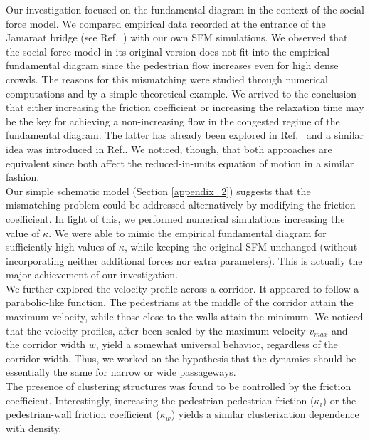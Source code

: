 \documentclass[preprint,12pt]{elsarticle}
\begin{document}
Our investigation focused on the fundamental diagram in the context of the 
social force model. We compared empirical data recorded at 
the entrance of the Jamaraat bridge (see Ref.~\cite{helbing3}) with our own SFM 
simulations. We observed  that the  social force model in its 
original version does not fit into the empirical fundamental 
diagram since the pedestrian flow increases even for high dense 
crowds. The reasons for this mismatching were studied through 
numerical computations and by a simple theoretical example. We arrived to the 
conclusion that either increasing the friction coefficient or increasing the 
relaxation time may be the key for achieving a non-increasing 
flow in the congested regime of the fundamental diagram. The 
latter has already been explored in Ref.~\cite{johansson} and a 
similar idea was introduced in Ref.\cite{parisi2}. We noticed, 
though, that both approaches are equivalent since both affect 
the reduced-in-units equation of motion in a similar fashion.\\

Our simple schematic model (Section \ref{appendix_2}) suggests 
that the mismatching problem could be addressed 
alternatively by  modifying the friction coefficient. In light 
of this, we performed numerical simulations increasing the 
value of $\kappa$. We were able to mimic the empirical 
fundamental diagram for sufficiently high values of $\kappa$, 
while keeping the original SFM unchanged (without incorporating neither additional forces nor extra parameters). 
This is actually the major achievement of our investigation. \\

We further explored the velocity profile 
across a corridor. It appeared to follow a parabolic-like 
function. The pedestrians at the middle of the 
corridor attain the maximum velocity, while those close to the 
walls attain the minimum. We noticed that the 
velocity profiles, after been scaled by the maximum velocity $v_{max}$ and the 
corridor width $w$, yield a somewhat universal behavior, 
regardless of the corridor width. Thus, we worked on the 
hypothesis that the dynamics should be essentially the same for narrow or wide 
passageways. \\

The presence of clustering structures was found to be controlled 
by the friction coefficient. Interestingly, increasing the 
pedestrian-pedestrian friction ($\kappa_i$) or the pedestrian-wall friction 
coefficient ($\kappa_w$) yields a similar clusterization dependence with 
density.\\
\end{document}

